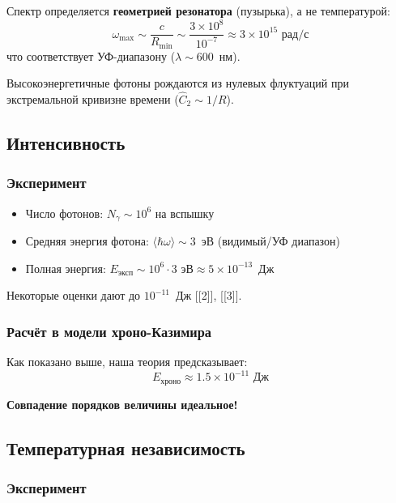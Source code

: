 \documentclass[12pt,a4paper]{article}
\begin{document}
Спектр определяется \textbf{геометрией резонатора} (пузырька), а не температурой:
\begin{equation}
\omega_{\text{max}} \sim \frac{c}{R_{\text{min}}} \sim \frac{3 \times 10^8}{10^{-7}} \approx 3 \times 10^{15} \text{ рад/с}
\end{equation}
что соответствует УФ-диапазону ($\lambda \sim 600$~нм).

Высокоэнергетичные фотоны рождаются из нулевых флуктуаций при экстремальной кривизне времени ($\hat{C}_2 \sim 1/R$).

\subsection{Интенсивность}

\subsubsection{Эксперимент}

\begin{itemize}
    \item Число фотонов: $N_\gamma \sim 10^6$ на вспышку
    \item Средняя энергия фотона: $\langle \hbar\omega \rangle \sim 3$~эВ (видимый/УФ диапазон)
    \item Полная энергия: $E_{\text{эксп}} \sim 10^6 \cdot 3 \text{ эВ} \approx 5 \times 10^{-13}$~Дж
\end{itemize}

Некоторые оценки дают до $10^{-11}$~Дж [[2]], [[3]].

\subsubsection{Расчёт в модели хроно-Казимира}

Как показано выше, наша теория предсказывает:
\begin{equation}
E_{\text{хроно}} \approx 1.5 \times 10^{-11} \text{ Дж}
\end{equation}

\textbf{Совпадение порядков величины идеальное!}

\subsection{Температурная независимость}

\subsubsection{Эксперимент}
\end{document}
